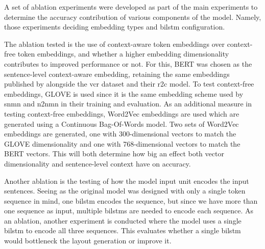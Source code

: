 A set of ablation experiments were developed as part of the main experiments to determine the accuracy contribution of various components of the model.
Namely, those experiments deciding embedding types and \gls{bilstm} configuration.

The ablation tested is the use of context-aware token embeddings over context-free token embeddings, and whether a higher embedding dimensionality contributes to improved performance or not.
For this, BERT was chosen as the sentence-level context-aware embedding, retaining the same embeddings published by \citeauthor{zellers_recognition_2019} alongside the \gls{vcr} dataset and their \gls{r2c} model\cite{zellers_recognition_2019}.
To test context-free embeddings, GLOVE is used since it is the same embedding scheme used by \gls{snmn} and \gls{n2nmn} in their training and evaluation.
As an additional measure in testing context-free embeddings, Word2Vec embeddings are used which are generated using a Continuous Bag-Of-Words model\cite{mikolov_we_2013}.
Two sets of Word2Vec embeddings are generated, one with 300-dimensional vectors to match the GLOVE dimensionality and one with 768-dimensional vectors to match the BERT vectors.
This will both determine how big an effect both vector dimensionality and sentence-level context have on accuracy.

Another ablation is the testing of how the model input unit encodes the input sentences.
Seeing as the original model was designed with only a single token sequence in mind, one \gls{bilstm} encodes the sequence, but since we have more than one sequence as input, multiple \glspl{bilstm} are needed to encode each sequence.
As an ablation, another experiment is conducted where the model uses a single \gls{bilstm} to encode all three sequences.
This evaluates whether a single \gls{bilstm} would bottleneck the layout generation or improve it.
